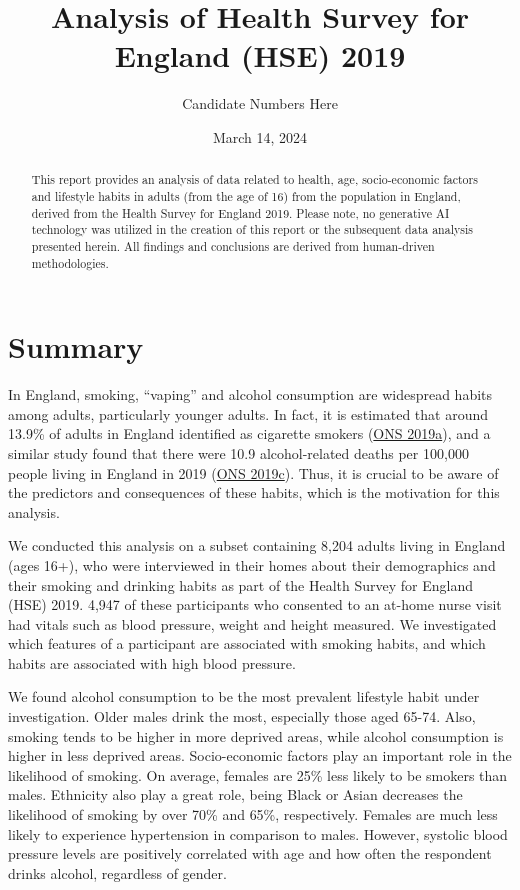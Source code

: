 \documentclass[
  11pt,
  twocolumn]{article}
\title{Analysis of Health Survey for England (HSE) 2019}
\author{Candidate Numbers Here}
\date{March 14, 2024}
\begin{document}
\maketitle
\begin{abstract}
This report provides an analysis of data related to health, age,
socio-economic factors and lifestyle habits in adults (from the age of
16) from the population in England, derived from the Health Survey for
England 2019. Please note, no generative AI technology was utilized in
the creation of this report or the subsequent data analysis presented
herein. All findings and conclusions are derived from human-driven
methodologies.
\end{abstract}


\clearpage

\hypertarget{summary}{%
\section{Summary}\label{summary}}

In England, smoking, ``vaping'' and alcohol consumption are widespread
habits among adults, particularly younger adults. In fact, it is
estimated that around 13.9\% of adults in England identified as
cigarette smokers (\protect\hyperlink{ref-1ONS}{ONS 2019a}), and a
similar study found that there were 10.9 alcohol-related deaths per
100,000 people living in England in 2019
(\protect\hyperlink{ref-2ONS}{ONS 2019c}). Thus, it is crucial to be
aware of the predictors and consequences of these habits, which is the
motivation for this analysis.

We conducted this analysis on a subset containing 8,204 adults living in
England (ages 16+), who were interviewed in their homes about their
demographics and their smoking and drinking habits as part of the Health
Survey for England (HSE) 2019. 4,947 of these participants who consented
to an at-home nurse visit had vitals such as blood pressure, weight and
height measured. We investigated which features of a participant are
associated with smoking habits, and which habits are associated with
high blood pressure.

We found alcohol consumption to be the most prevalent lifestyle habit
under investigation. Older males drink the most, especially those aged
65-74. Also, smoking tends to be higher in more deprived areas, while
alcohol consumption is higher in less deprived areas. Socio-economic
factors play an important role in the likelihood of smoking. On average,
females are 25\% less likely to be smokers than males. Ethnicity also
play a great role, being Black or Asian decreases the likelihood of
smoking by over 70\% and 65\%, respectively. Females are much less
likely to experience hypertension in comparison to males. However,
systolic blood pressure levels are positively correlated with age and
how often the respondent drinks alcohol, regardless of gender.
\end{document}
